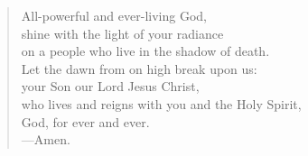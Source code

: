 \prayer

\setlength{\vleftmargin}{\prayerleftmargini}

\begin{verse}
All-powerful and ever-living God,\\
shine with the light of your radiance\\
on a people who live in the shadow of death.\\
Let the dawn from on high break upon us:\\
your Son our Lord Jesus Christ,\\
who lives and reigns with you and the Holy Spirit,\\
God, for ever and ever.\\
{\color{red}---\thinspace}Amen.
\end{verse}

\setlength{\vleftmargin}{\defleftmargini}